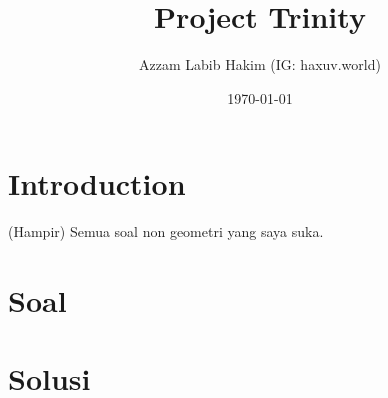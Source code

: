 

\title{Project Trinity}
\author{Azzam Labib Hakim (IG: haxuv.world)}
\date{\today}



\maketitle

\renewcommand*\contentsname{Daftar Isi}
\tableofcontents

\newpage

\section*{Introduction}
(Hampir) Semua soal non geometri yang saya suka. 

\section{Soal}


\newpage
\section{Solusi}



